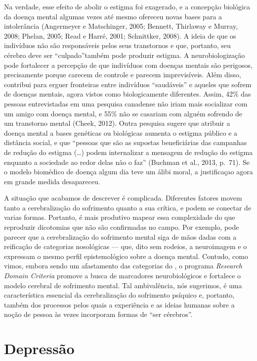Na verdade, esse efeito de abolir o estigma foi exagerado, e a concepção
biológica da doença mental algumas vezes até mesmo ofereceu novas bases
para a intolerância (Angermeyer e Matschinger, 2005; Bennett, Thirlaway
e Murray, 2008; Phelan, 2005; Read e Harré, 2001; Schnittker, 2008). A
ideia de que os indivíduos não são responsáveis pelos seus transtornos e
que, portanto, seu cérebro deve ser ``culpado''também pode produzir
estigma. A neurobiologização pode fortalecer a percepção de que
indivíduos com doenças mentais são perigosos, precisamente porque
carecem de controle e parecem imprevisíveis. Além disso, contribui para
erguer fronteiras entre indivíduos ``saudáveis'' e aqueles que sofrem de
doenças mentais, agora vistos como biologicamente diferentes. Assim,
42\% das pessoas entrevistadas em uma pesquisa canadense não iriam mais
socializar com um amigo com doença mental, e 55\% não se casariam com
alguém sofrendo de um transtorno mental (Cheek, 2012). Outra pesquisa
sugere que atribuir a doença mental a bases genéticas ou biológicas
aumenta o estigma público e a distância social, e que ``pessoas que são
as supostas beneficiárias das campanhas de redução do estigma (\ldots{})
podem internalizar a mensagem de redução do estigma enquanto a sociedade
ao redor delas não o faz'' (Buchman et al., 2013, p.~71). Se o modelo
biomédico de doença algum dia teve um álibi moral, a justificaçao agora
em grande medida desapareceu.

A situação que acabamos de descrever é complicada. Diferentes fatores
movem tanto a cerebralização do sofrimento quanto a sua crítica, e podem
se conectar de varias formas. Portanto, é mais produtivo mapear essa
complexidade do que reproduzir dicotomias que não são confirmadas no
campo. Por exemplo, pode parecer que a cerebralização do sofrimento
mental siga de mãos dadas com a reificação de categorias nosológicas ---
que, dito sem rodeios, a neuroimagem e o \emph{} expressam o mesmo
perfil epistemológico sobre a doença mental. Contudo, como vimos, embora
sendo um afastamento das categorias do \emph{}, o programa
\emph{Research Domain Criteria} promove a busca de marcadores
neurobiológicos e fortalece o modelo cerebral de sofrimento mental. Tal
ambivalência, nós sugerimos, é uma característica essencial da
cerebralização do sofrimento psíquico e, portanto, também dos processos
pelos quais a experiência e as ideias humanas sobre a noção de pessoa às
vezes incorporam formas de ``ser cérebros''.

\chapter{Depressão}


